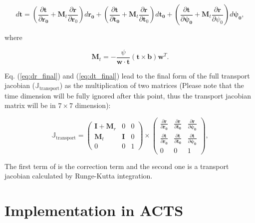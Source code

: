 \documentclass[12pt,a4paper]{scrarticle}
\begin{document}
\begin{equation}\label{eq:dt_final}
    d \mathbf{t} = 
    \left( 
    \frac{\partial \mathbf{t}}{\partial \mathbf{r_0}}  + \mathbf{M}_t  \frac{\partial \mathbf{r}}{\partial \mathbf{r}_0}
    \right) d\mathbf{r_0} +
    \left( 
    \frac{\partial \mathbf{t}}{\partial \mathbf{t_0}} + \mathbf{M}_t \frac{\partial \mathbf{r}}{\partial \mathbf{t}_0}
    \right) d\mathbf{t_0} +
    \left( 
    \frac{\partial \mathbf{t}}{\partial \mathbf{\psi_0}} + \mathbf{M}_t \frac{\partial \mathbf{r}}{\partial \psi_0}
    \right) d\mathbf{\psi_0},
\end{equation}

where

\begin{equation}
 \mathbf{M}_t = -\frac{\psi}{\mathbf{w} \cdot \mathbf{t}} ( \mathbf{t} \times \mathbf{b}) \mathbf{w}^T .
\end{equation}

Eq. (\ref{eq:dr_final}) and (\ref{eq:dt_final}) lead to the final form of the full transport jacobian ($\mathbb{J}_{\textrm{transport}}$) as the multiplication of two matrices (Please note that the time dimension will be fully ignored after this point, thus the transport jacobian matrix will be in $7 \times 7$ dimension):

\begin{equation}\label{eq:jacobi}
    \mathbb{J}_{\textrm{transport}} = 
    \begin{pmatrix}
     \mathbf{I} + \mathbf{M}_r & 0 & 0 \\
     \mathbf{M}_t & \mathbf{I} & 0 \\
     0 & 0 & 1
    \end{pmatrix} \times
    \begin{pmatrix}
     \frac{\partial{\mathbf{r}}}{\partial{\mathbf{r_0}}} & \frac{\partial{\mathbf{r}}}{\partial{\mathbf{t_0}}} & \frac{\partial{\mathbf{r}}}{\partial{\mathbf{\psi_0}}} \\
     \frac{\partial{\mathbf{t}}}{\partial{\mathbf{r_0}}} & \frac{\partial{\mathbf{t}}}{\partial{\mathbf{t_0}}} & \frac{\partial{\mathbf{t}}}{\partial{\mathbf{\psi_0}}} \\
     0 & 0 & 1
    \end{pmatrix}    ,
\end{equation}

The first term of is the correction term and the second one is a transport jacobian calculated by Runge-Kutta integration.

\section{Implementation in ACTS}
\end{document}
